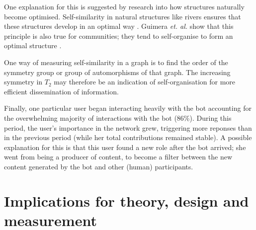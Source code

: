 \documentclass{sig-alternate}
\begin{document}
One explanation for this is suggested by research into how structures naturally become optimised. Self-similarity in natural structures like rivers ensures that these structures develop in an optimal way \cite{murray:min}. Guimera \emph{et. al.} show that this principle is also true for communities; they tend to self-organise to form an optimal structure \cite{guimera:comm}.

One way of measuring self-similarity in a graph is to find the order of the symmetry group or group of automorphisms of that graph. The increasing symmetry in $T_2$ may therefore be an indication of self-organisation for more efficient dissemination of information.

Finally, one particular user began interacting heavily with the bot accounting for the overwhelming majority of interactions with the bot (86\%). During this period, the user's importance in the network grew, triggering more reponses than in the previous period (while her total contributions remained stable). A possible explanation for this is that this user found a new role after the bot arrived; she went from being a producer of content, to become a filter between the new content generated by the bot and other (human) participants.

\section{Implications for theory, design and measurement}


\end{document}
